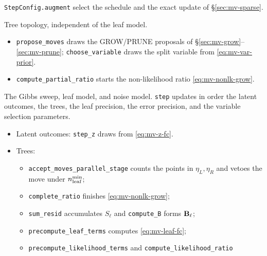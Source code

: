 \begin{description}
\begin{description}
\begin{itemize}
			                  \texttt{StepConfig.augment} select the
			                  schedule and the exact update of
			                  \S\ref{sec:mv-sparse}.
		            \end{itemize}
		      \item[\texttt{\_moves.py}] Tree topology, independent of the
		            leaf model.
		            \begin{itemize}
			            \item \texttt{propose\_moves} draws the GROW/PRUNE
			                  proposals of \S\ref{sec:mv-grow}--\ref{sec:mv-prune};
			                  \texttt{choose\_variable} draws the split
			                  variable from \eqref{eq:mv-var-prior}.
			            \item \texttt{compute\_partial\_ratio} starts the
			                  non-likelihood ratio \eqref{eq:mv-nonlk-grow}.
		            \end{itemize}
		      \item[\texttt{\_step.py}] The Gibbs sweep, leaf model, and
		            noise model. \texttt{step} updates in order the latent
		            outcomes, the trees, the leaf precision, the error
		            precision, and the variable selection parameters.
		            \begin{itemize}
			            \item Latent outcomes: \texttt{step\_z} draws from
			                  \eqref{eq:mv-z-fc}.
			            \item Trees:
			                  \begin{itemize}
				                  \item \texttt{accept\_moves\_parallel\_stage}
					                        counts the points in
					                        $\eta_L, \eta_R$ and vetoes the
					                        move under $n^{\min}_{\mathrm{leaf}}$;
					                  \item \texttt{complete\_ratio} finishes
				                        \eqref{eq:mv-nonlk-grow};
				                  \item \texttt{sum\_resid} accumulates
				                        $S_\ell$ and \texttt{compute\_B}
				                        forms $\mathbf{B}_\ell$;
				                  \item \texttt{precompute\_leaf\_terms}
				                        computes \eqref{eq:mv-leaf-fc};
				                  \item \texttt{precompute\_likelihood\_terms}
				                        and \texttt{compute\_likelihood\_ratio}

\end{itemize}
\end{itemize}
\end{description}
\end{description}
